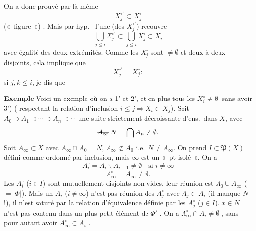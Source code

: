 \documentclass[11pt,a4paper]{article}
\begin{document}
On a donc prouvé par là-même
\[
X_j^{\circ\prime} \subset X_j^\circ
\]
(«~figure~») .   Mais par hyp.\ \ill{}
l'une (des $X_j^{\circ\prime}$) recouvre  
\[
\bigcup_{j \leq i} X_j^{\circ\prime} \subset \bigcup_{j \leq i} X_j^\circ \subset X_i
\]
avec égalité des deux extrémités. Comme les $X_j^\circ$ sont $\neq \emptyset$ et
deux à deux disjoints, cela implique que
\[
X_j^{\circ\prime} = X_j^\circ :
\]
 
   si $j, k \leq i$,
je dis que 



\textbf{Exemple} Voici un exemple où on a 1' et 2', et en plus tous les
$X_i^\circ \neq \emptyset$, sans avoir 3') ( respectant la
relation d'inclusion $i \leq j \Rightarrow X_i \subset X_j$).
Soit  $A_0 \supset A_1 \supset \cdots \supset A_n \supset \cdots$
une suite strictement décroissante d'ens.\ dans $X$, avec
\[
\text{\struck{$A_\infty$}}\ N = \bigcap A_n \neq \emptyset .
\]
Soit $A_\infty \subset X$ avec $A_\infty \cap A_0 = N$, $A_\infty \not\subset A_0$
i.e.\ $N \neq A_\infty$. On prend $I \subset \mathfrak{P}(X)$ défini comme
  \ill{} \ill{} ordonné par
inclusion, mais $\infty$ est un «~pt isolé~». On a
\[
A_i^\circ = A_i \smallsetminus A_{i+1} \neq \emptyset \quad \text{si } i \neq \infty
\]
\[
A_\infty^\circ = A_\infty \neq \emptyset .
\]
\struck{\ill{}} Les $A_i^\circ$ ($i \in I$) sont mutuellement disjoints non
vides, leur réunion est $A_0 \cup A_\infty$ ($= |\Phi|$). Mais un $A_i$
($i \neq \infty$) n'est pas réunion des $A_j^\circ$ avec $A_j \subset A_i$
(il manque $N$ !), il n'est  saturé par la relation d'équivalence
définie par les $A_j^\circ$ ($j \in I$).  
$x \in N$ n'est pas contenu dans un plus petit élément de $\Phi'$
. On a $A_\infty^\circ \cap A_i \neq \emptyset$
, sans pour autant avoir
$A_\infty^\circ \subset A_i$ .
\end{document}
